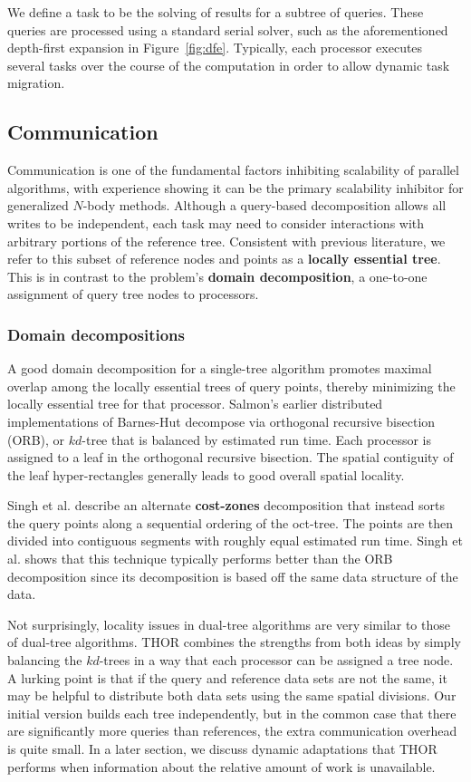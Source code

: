 \documentclass[twoside,leqno,twocolumn]{article}
\newcommand{\fig}[1]{Figure~\ref{fig:#1}}
\newcommand{\mysubsub}[1]{\subsubsection{#1} }
\newcommand{\defterm}[1]{{\bf #1}}
\begin{document}
We define a task to be the solving of results for a subtree of queries.
These queries are processed using a standard serial solver, such as the aforementioned depth-first expansion in \fig{dfe}.
Typically, each processor executes several tasks over the course of the computation in order to allow dynamic task migration.

\subsection{Communication}

Communication is one of the fundamental factors inhibiting scalability of parallel algorithms, with experience showing it can be the primary scalability inhibitor for generalized $N$-body methods.
Although a query-based decomposition allows all writes to be independent, each task may need to consider interactions with arbitrary portions of the reference tree.
Consistent with previous literature\cite{salmon_thesis, singh_thesis}, we refer to this subset of reference nodes and points as a \defterm{locally essential tree}.
This is in contrast to the problem's \defterm{domain decomposition}, a one-to-one assignment of query tree nodes to processors.

\mysubsub{Domain decompositions}
A good domain decomposition for a single-tree algorithm promotes maximal overlap among the locally essential trees of query points, thereby minimizing the locally essential tree for that processor.
Salmon's earlier distributed implementations of Barnes-Hut \cite{salmon_thesis} decompose via orthogonal recursive bisection (ORB), or $kd$-tree that is balanced by estimated run time.
Each processor is assigned to a leaf in the orthogonal recursive bisection.
The spatial contiguity of the leaf hyper-rectangles generally leads to good overall spatial locality.

Singh et al. describe an alternate \defterm{cost-zones} decomposition\cite{singh95load} that instead sorts the query points along a sequential ordering of the oct-tree.
The points are then divided into contiguous segments with roughly equal estimated run time.
Singh et al. shows\cite{singh95load} that this technique typically performs better than the ORB decomposition since its decomposition is based off the same data structure of the data.

Not surprisingly, locality issues in dual-tree algorithms are very similar to those of dual-tree algorithms.
THOR combines the strengths from both ideas by simply balancing the $kd$-trees in a way that each processor can be assigned a tree node.
A lurking point is that if the query and reference data sets are not the same, it may be helpful to distribute both data sets using the same spatial divisions.
Our initial version builds each tree independently, but in the common case that there are significantly more queries than references, the extra communication overhead is quite small.
In a later section, we discuss dynamic adaptations that THOR performs when information about the relative amount of work is unavailable.
\end{document}
